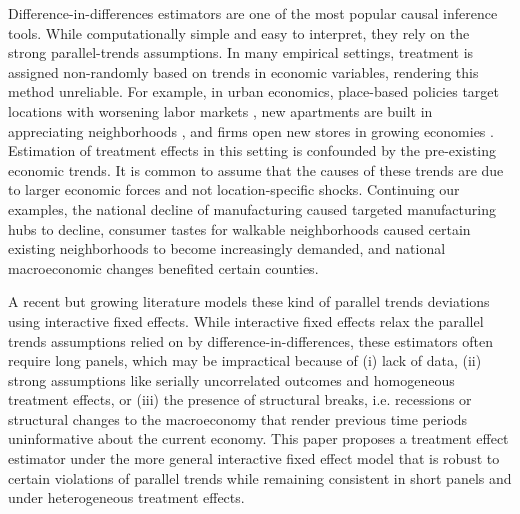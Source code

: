 \documentclass[12pt]{article}
\begin{document}
Difference-in-differences estimators are one of the most popular causal inference tools. While computationally simple and easy to interpret, they rely on the strong parallel-trends assumptions. In many empirical settings, treatment is assigned non-randomly based on trends in economic variables, rendering this method unreliable. For example, in urban economics, place-based policies target locations with worsening labor markets \citep{neumark2015place}, new apartments are built in appreciating neighborhoods \citep{asquith2021local,pennington2021does}, and firms open new stores in growing economies \citep{basker2005job,neumark2008effects}. Estimation of treatment effects in this setting is confounded by the pre-existing economic trends. It is common to assume that the causes of these trends are due to larger economic forces and not location-specific shocks. Continuing our examples, the national decline of manufacturing caused targeted manufacturing hubs to decline, consumer tastes for walkable neighborhoods caused certain existing neighborhoods to become increasingly demanded, and national macroeconomic changes benefited certain counties. 

A recent but growing literature models these kind of parallel trends deviations using interactive fixed effects. While interactive fixed effects relax the parallel trends assumptions relied on by difference-in-differences, these estimators often require long panels, which may be impractical because of (i) lack of data, (ii) strong assumptions like serially uncorrelated outcomes and homogeneous treatment effects, or (iii) the presence of structural breaks, i.e. recessions or structural changes to the macroeconomy that render previous time periods uninformative about the current economy. This paper proposes a treatment effect estimator under the more general interactive fixed effect model that is robust to certain violations of parallel trends while remaining consistent in short panels and under heterogeneous treatment effects. 
\end{document}
